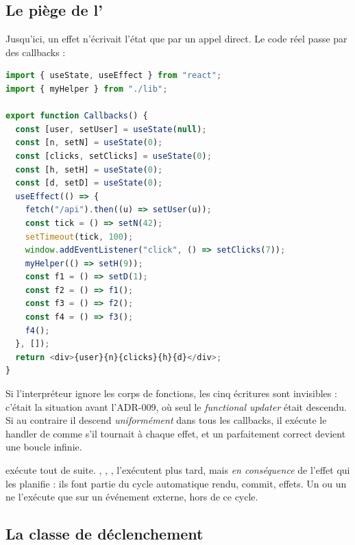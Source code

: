 \subsection{Le piège de l'}

Jusqu'ici, un effet n'écrivait l'état que par un appel direct. Le code réel
passe par des callbacks :

\begin{lstlisting}[language=TypeScript,caption={Cinq façons d'appeler un setter depuis un effet (\file{/tmp/ch11/ex9.tsx})},label={lst:transfert-stores-callbacks}]
import { useState, useEffect } from "react";
import { myHelper } from "./lib";

export function Callbacks() {
  const [user, setUser] = useState(null);
  const [n, setN] = useState(0);
  const [clicks, setClicks] = useState(0);
  const [h, setH] = useState(0);
  const [d, setD] = useState(0);
  useEffect(() => {
    fetch("/api").then((u) => setUser(u));
    const tick = () => setN(42);
    setTimeout(tick, 100);
    window.addEventListener("click", () => setClicks(7));
    myHelper(() => setH(9));
    const f1 = () => setD(1);
    const f2 = () => f1();
    const f3 = () => f2();
    const f4 = () => f3();
    f4();
  }, []);
  return <div>{user}{n}{clicks}{h}{d}</div>;
}
\end{lstlisting}

Si l'interpréteur ignore les corps de fonctions, les cinq écritures sont
invisibles : c'était la situation avant l'ADR-009, où seul le
\emph{functional updater} était descendu. Si au contraire il descend
\emph{uniformément} dans tous les callbacks, il exécute le handler de
 comme s'il tournait à chaque effet, et un
 parfaitement
correct devient une \og boucle infinie\fg{}.

\begin{react}
   exécute  tout de suite. ,
  , ,
   l'exécutent plus tard, mais \emph{en
  conséquence} de l'effet qui les planifie : ils font partie du cycle
  automatique rendu, commit, effets. Un  ou un
   ne l'exécute que sur un événement externe, hors de ce
  cycle.
\end{react}

\subsection{La classe de déclenchement}

